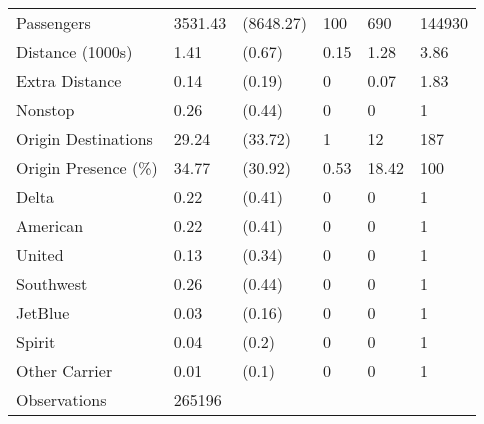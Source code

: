 \begin{tabular}[t]{llllll}
\hspace{1em}Passengers & 3531.43 & (8648.27) & 100 & 690 & 144930\\
\hspace{1em}Distance (1000s) & 1.41 & (0.67) & 0.15 & 1.28 & 3.86\\
\hspace{1em}Extra Distance & 0.14 & (0.19) & 0 & 0.07 & 1.83\\
\hspace{1em}Nonstop & 0.26 & (0.44) & 0 & 0 & 1\\
\hspace{1em}Origin Destinations & 29.24 & (33.72) & 1 & 12 & 187\\
\hspace{1em}Origin Presence (\%) & 34.77 & (30.92) & 0.53 & 18.42 & 100\\
\hspace{1em}Delta & 0.22 & (0.41) & 0 & 0 & 1\\
\hspace{1em}American & 0.22 & (0.41) & 0 & 0 & 1\\
\hspace{1em}United & 0.13 & (0.34) & 0 & 0 & 1\\
\hspace{1em}Southwest & 0.26 & (0.44) & 0 & 0 & 1\\
\hspace{1em}JetBlue & 0.03 & (0.16) & 0 & 0 & 1\\
\hspace{1em}Spirit & 0.04 & (0.2) & 0 & 0 & 1\\
\hspace{1em}Other Carrier & 0.01 & (0.1) & 0 & 0 & 1\\
\midrule
\hspace{1em}Observations & 265196 &  &  &  & \\
\bottomrule
\end{tabular}
